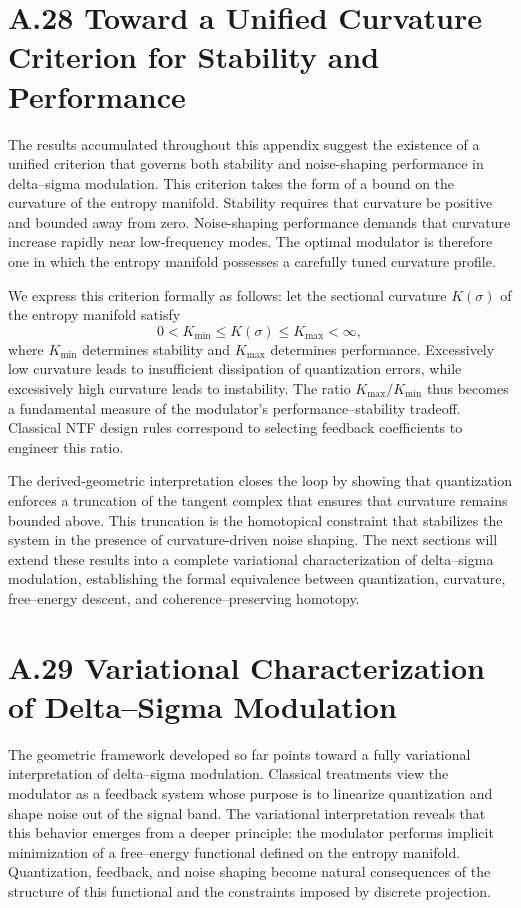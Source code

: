 \section{A.28 Toward a Unified Curvature Criterion for Stability and Performance}

The results accumulated throughout this appendix suggest the existence of a unified criterion that governs both stability and noise-shaping performance in delta–sigma modulation. This criterion takes the form of a bound on the curvature of the entropy manifold. Stability requires that curvature be positive and bounded away from zero. Noise-shaping performance demands that curvature increase rapidly near low-frequency modes. The optimal modulator is therefore one in which the entropy manifold possesses a carefully tuned curvature profile.

We express this criterion formally as follows: let the sectional curvature \(K(\sigma)\) of the entropy manifold satisfy
\[
0 < K_{\min} \le K(\sigma) \le K_{\max} < \infty,
\]
where \(K_{\min}\) determines stability and \(K_{\max}\) determines performance. Excessively low curvature leads to insufficient dissipation of quantization errors, while excessively high curvature leads to instability. The ratio \(K_{\max}/K_{\min}\) thus becomes a fundamental measure of the modulator’s performance–stability tradeoff. Classical NTF design rules correspond to selecting feedback coefficients to engineer this ratio.

The derived-geometric interpretation closes the loop by showing that quantization enforces a truncation of the tangent complex that ensures that curvature remains bounded above. This truncation is the homotopical constraint that stabilizes the system in the presence of curvature-driven noise shaping. The next sections will extend these results into a complete variational characterization of delta–sigma modulation, establishing the formal equivalence between quantization, curvature, free–energy descent, and coherence–preserving homotopy.

\section{A.29 Variational Characterization of Delta–Sigma Modulation}

The geometric framework developed so far points toward a fully variational interpretation of delta–sigma modulation. Classical treatments view the modulator as a feedback system whose purpose is to linearize quantization and shape noise out of the signal band. The variational interpretation reveals that this behavior emerges from a deeper principle: the modulator performs implicit minimization of a free–energy functional defined on the entropy manifold. Quantization, feedback, and noise shaping become natural consequences of the structure of this functional and the constraints imposed by discrete projection.

